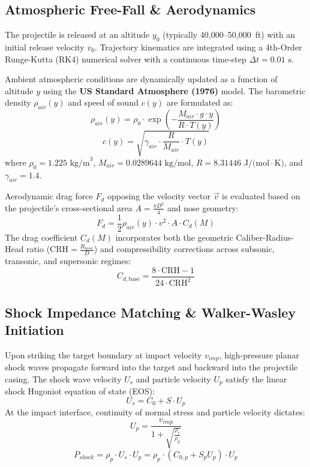 \documentclass[journal,10pt,twocolumn]{IEEEtran}
\begin{document}
\subsection{Atmospheric Free-Fall \& Aerodynamics}
The projectile is released at an altitude $y_0$ (typically 40,000--50,000~ft) with an initial release velocity $v_0$. Trajectory kinematics are integrated using a 4th-Order Runge-Kutta (RK4) numerical solver with a continuous time-step $\Delta t = 0.01\text{ s}$.

Ambient atmospheric conditions are dynamically updated as a function of altitude $y$ using the \textbf{US Standard Atmosphere (1976)} model. The barometric density $\rho_{air}(y)$ and speed of sound $c(y)$ are formulated as:
\begin{equation}
\rho_{air}(y) = \rho_0 \cdot \exp\left(-\frac{M_{air} \cdot g \cdot y}{R \cdot T(y)}\right)
\end{equation}
\begin{equation}
c(y) = \sqrt{\gamma_{air} \cdot \frac{R}{M_{air}} \cdot T(y)}
\end{equation}
where $\rho_0 = 1.225\text{ kg/m}^3$, $M_{air} = 0.0289644\text{ kg/mol}$, $R = 8.31446\text{ J/(mol}\cdot\text{K)}$, and $\gamma_{air} = 1.4$.

Aerodynamic drag force $F_d$ opposing the velocity vector $\vec{v}$ is evaluated based on the projectile's cross-sectional area $A = \frac{\pi D^2}{4}$ and nose geometry:
\begin{equation}
F_d = \frac{1}{2} \rho_{air}(y) \cdot v^2 \cdot A \cdot C_d(M)
\end{equation}
The drag coefficient $C_d(M)$ incorporates both the geometric Caliber-Radius-Head ratio ($\text{CRH} = \frac{R_{nose}}{D}$) and compressibility corrections across subsonic, transonic, and supersonic regimes:
\begin{equation}
C_{d,\text{base}} = \frac{8 \cdot \text{CRH} - 1}{24 \cdot \text{CRH}^2}
\end{equation}

\subsection{Shock Impedance Matching \& Walker-Wasley Initiation}
Upon striking the target boundary at impact velocity $v_{imp}$, high-pressure planar shock waves propagate forward into the target and backward into the projectile casing. The shock wave velocity $U_s$ and particle velocity $U_p$ satisfy the linear shock Hugoniot equation of state (EOS):
\begin{equation}
U_s = C_0 + S \cdot U_p
\end{equation}
At the impact interface, continuity of normal stress and particle velocity dictates:
\begin{equation}
U_p = \frac{v_{imp}}{1 + \sqrt{\frac{\rho_t}{\rho_p}}}
\end{equation}
\begin{equation}
P_{shock} = \rho_p \cdot U_s \cdot U_p = \rho_p \cdot (C_{0,p} + S_p U_p) \cdot U_p
\end{equation}
\end{document}
